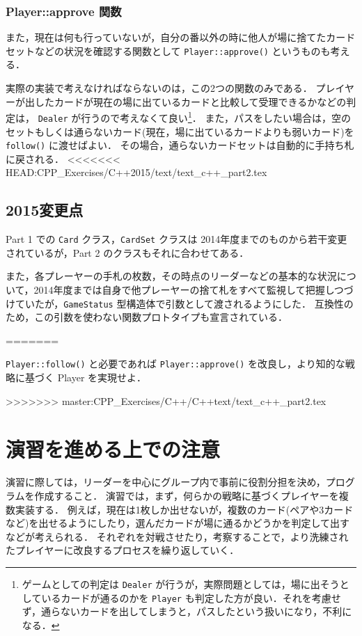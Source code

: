 \subsubsection*{Player::approve 関数}
また，現在は何も行っていないが，自分の番以外の時に他人が場に捨てたカードセットなどの状況を確認する関数として \verb+Player::approve()+ というものも考える．
 
実際の実装で考えなければならないのは，この2つの関数のみである．
プレイヤーが出したカードが現在の場に出ているカードと比較して受理できるかなどの判定は， \verb+Dealer+ が行うので考えなくて良い\footnote{ゲームとしての判定は \verb+Dealer+ が行うが，実際問題としては，場に出そうとしているカードが通るのかを \verb+Player+ も判定した方が良い．それを考慮せず，通らないカードを出してしまうと，パスしたという扱いになり，不利になる．}．
また，パスをしたい場合は，空のセットもしくは通らないカード(現在，場に出ているカードよりも弱いカード)を \verb+follow()+ に渡せばよい．
その場合，通らないカードセットは自動的に手持ち札に戻される．
<<<<<<< HEAD:CPP_Exercises/C++2015/text/text_c++_part2.tex

\subsection*{2015変更点}
Part 1 での \verb+Card+ クラス，\verb+CardSet+ クラスは 2014年度までのものから若干変更されているが，Part 2 のクラスもそれに合わせてある．

また，各プレーヤーの手札の枚数，その時点のリーダーなどの基本的な状況について，2014年度までは自身で他プレーヤーの捨て札をすべて監視して把握しつづけていたが，\verb+GameStatus+ 型構造体で引数として渡されるようにした．
互換性のため，この引数を使わない関数プロトタイプも宣言されている．

=======
 
\begin{exerc}
\verb+Player::follow()+ と必要であれば \verb+Player::approve()+ を改良し，より知的な戦略に基づく Player を実現せよ． 
\end{exerc}
>>>>>>> master:CPP_Exercises/C++/C++text/text_c++_part2.tex
\section*{演習を進める上での注意}
演習に際しては，リーダーを中心にグループ内で事前に役割分担を決め，プログラムを作成すること．
演習では，まず，何らかの戦略に基づくプレイヤーを複数実装する．
例えば，現在は1枚しか出せないが，複数のカード(ペアや3カードなど)を出せるようにしたり，選んだカードが場に通るかどうかを判定して出すなどが考えられる．
それぞれを対戦させたり，考察することで，より洗練されたプレイヤーに改良するプロセスを繰り返していく．

